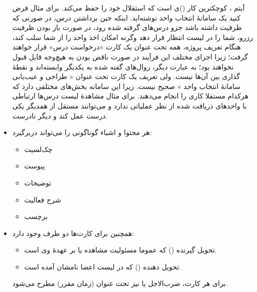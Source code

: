 \documentclass[]{article}
\begin{document}
\begin{itemize}
آیتم ، کوچکترین کار ()ی است که استقلال خود را حفظ می‌کند. برای مثال فرض کنید یک سامانهٔ انتخاب واحد نوشته‌اید. اینکه حین برداشتن درس، در صورتی که ظرفیت داشته باشد جزو درس‌های گرفته شده رود، در صورت باز بودن ظرفیت رزرو، شما را در لیست انتظار قرار دهد وگرنه امکان اخذ واحد را از شما سلب کند، هنگام تعریف پروژه، همه تحت عنوان یک کارت «درخواست درس» قرار خواهند گرفت؛ زیرا اجزای مختلف این فرآیند در صورت ناقص بودن به هیچ‌وجه قابل قبول نخواهند بود؛ به عبارت دیگر، روال‌های گفته شده به یکدیگر وابسته‌اند و نقطهٔ گذاری بین آن‌ها نیست. ولی تعریف یک کارت تحت عنوان « طراحی و عیب‌یابی سامانهٔ انتخاب واحد » صحیح نیست. زیرا این سامانه بخش‌های مختلفی دارد که هرکدام مستقلا کاری را انجام می‌دهند. برای مثال مشاهدهٔ لیست درس‌ها ارتباطی با واحد‌های دریافت شده از نظر عملیاتی ندارد و می‌توانند مستقل از همدیگر یکی درست عمل کند و دیگر نادرست.

\item
هر  محتوا و اشیاء گوناگونی را می‌تواند دربرگیرد:


\begin{itemize}
\item
چک‌لسیت

\item
پیوست

\item
توضیحات

\item
شرح فعالیت

\item
برچسب

\end{itemize}


\item
همچنین برای کارت‌ها دو طرف وجود دارد:

\begin{itemize}

\item
تحویل گیرنده () که عموما مسئولیت مشاهده یا  بر عهدهٔ وی است.

\item
تحویل دهنده () که در لیست اعضا نامشان آمده است.

\end{itemize}

برای هر کارت، ضرب‌الاجل یا  نیز تحت عنوان  (زمان مقرر) مطرح می‌شود.

\end{itemize}
\end{document}
